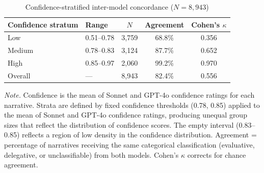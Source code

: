 \begin{table}[htbp]
\centering
\small
\caption{Confidence-stratified inter-model concordance ($N = 8{,}943$)}
\label{tab:cfpb_concordance}
\begin{tabular}{llccc}
\toprule
Confidence stratum & Range & $N$ & Agreement & Cohen's $\kappa$ \\
\midrule
Low     & 0.51--0.78 & 3{,}759 & 68.8\% & 0.356 \\
Medium  & 0.78--0.83 & 3{,}124 & 87.7\% & 0.652 \\
High    & 0.85--0.97 & 2{,}060 & 99.2\% & 0.970 \\
\midrule
Overall & ---        & 8{,}943 & 82.4\% & 0.556 \\
\bottomrule
\end{tabular}
\begin{flushleft}
\footnotesize
\textit{Note.} Confidence is the mean of Sonnet and GPT-4o confidence ratings for each narrative. Strata are defined by fixed confidence thresholds (0.78, 0.85) applied to the mean of Sonnet and GPT-4o confidence ratings, producing unequal group sizes that reflect the distribution of confidence scores. The empty interval (0.83--0.85) reflects a region of low density in the confidence distribution. Agreement = percentage of narratives receiving the same categorical classification (evaluative, delegative, or unclassifiable) from both models. Cohen's $\kappa$ corrects for chance agreement.
\end{flushleft}
\end{table}
